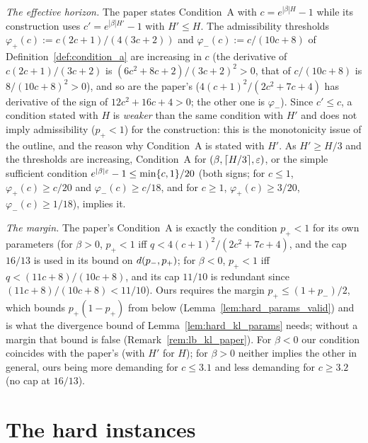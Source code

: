 \begin{remark}[On Condition~A]\label{rem:lb_condition_a}
\emph{The effective horizon.} The paper states Condition~A with $c = e^{|\beta|H} - 1$ while its
construction uses $c' = e^{|\beta|H'} - 1$ with $H' \le H$. The admissibility thresholds
$\varphi_+(c) := c(2c+1)/(4(3c+2))$ and $\varphi_-(c) := c/(10c+8)$ of
Definition~\ref{def:condition_a} are increasing in $c$ (the derivative of $c(2c+1)/(3c+2)$ is
$(6c^2 + 8c + 2)/(3c+2)^2 > 0$, that of $c/(10c+8)$ is $8/(10c+8)^2 > 0$), and so are the
paper's ($4(c+1)^2/(2c^2+7c+4)$ has derivative of the sign of $12c^2 + 16c + 4 > 0$; the other
one is $\varphi_-$). Since $c' \le c$, a condition stated with $H$ is \emph{weaker} than the same
condition with $H'$ and does not imply admissibility ($p_+ < 1$) for the construction: this is
the monotonicity issue of the outline, and the reason why Condition~A is stated with $H'$. As
$H' \ge H/3$ and the thresholds are increasing, Condition~A for $(\beta, \lceil H/3 \rceil, \varepsilon)$,
or the simple sufficient condition $e^{|\beta|\varepsilon} - 1 \le \min\{c, 1\}/20$ (both signs; for
$c \le 1$, $\varphi_+(c) \ge c/20$ and $\varphi_-(c) \ge c/18$, and for $c \ge 1$,
$\varphi_+(c) \ge 3/20$, $\varphi_-(c) \ge 1/18$), implies it.

\emph{The margin.} The paper's Condition~A is exactly the condition $p_+ < 1$ for its own
parameters (for $\beta > 0$, $p_+ < 1$ iff $q < 4(c+1)^2/(2c^2+7c+4)$, and the cap $16/13$ is used
in its bound on $d(p_-,p_+)$; for $\beta < 0$, $p_+ < 1$ iff $q < (11c+8)/(10c+8)$, and its
cap $11/10$ is redundant since $(11c+8)/(10c+8) < 11/10$). Ours requires the margin
$p_+ \le (1 + p_-)/2$, which bounds $p_+(1 - p_+)$ from below (Lemma~\ref{lem:hard_params_valid})
and is what the divergence bound of Lemma~\ref{lem:hard_kl_params} needs; without a margin that
bound is false (Remark~\ref{rem:lb_kl_paper}). For $\beta < 0$ our condition coincides with the
paper's (with $H'$ for $H$); for $\beta > 0$ neither implies the other in general, ours being
more demanding for $c \le 3.1$ and less demanding for $c \ge 3.2$ (no cap at $16/13$).
\end{remark}

\section{The hard instances}
\label{sec:lb_instances}

